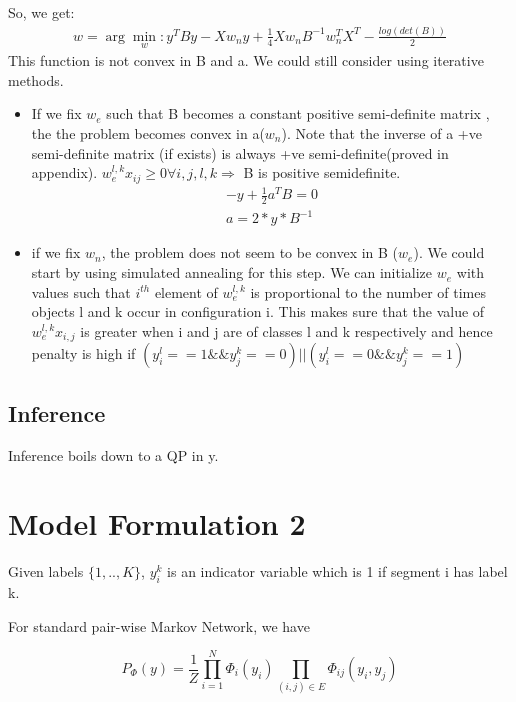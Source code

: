 \documentclass[11pt,a4paper,oneside]{report}
\begin{document}
So, we get:
\begin{eqnarray}
w=\arg\min_{w}:y^T B y-Xw_ny +\frac{1}{4}Xw_n B^{-1} w_n^TX^T-\frac{log(det(B))}{2}
\end{eqnarray}
This function is not convex in B and a. We could still consider using iterative methods.

\begin{itemize}
\item If we fix $w_e$ such that B becomes a constant positive semi-definite matrix , the the problem becomes convex in a($w_n$). Note that the inverse of a +ve semi-definite matrix (if exists) is always +ve semi-definite(proved in appendix). $w_e^{l,k}x_{ij} \ge 0 \forall i,j,l,k \Rightarrow$ B is positive semidefinite.
\begin{eqnarray}
-y +\frac{1}{2}a^TB=0\\
a=2*y*B^{-1}
\end{eqnarray}

\item if we fix $w_n$, the problem does not seem to be convex in B ($w_e$). We could start by using simulated annealing for this step. We can initialize $w_e$ with values such that $i^{th}$ element of $w_e^{l,k}$ is proportional to the number of times objects l and k occur in configuration i. This makes sure that the value of $w_e^{l,k}x_{i,j}$ is greater when i and j are of classes l and k respectively and hence penalty is high if  $(y_i^l==1 \&\& y_j^k==0) || (y_i^l==0 \&\& y_j^k==1)$
\end{itemize}

\subsection{Inference}
Inference boils down to a QP in y.

\section{Model Formulation 2}
Given labels $\{1,.., K\}$, $y_i^k$ is an indicator variable which is 1 if segment i has label k. 

For standard pair-wise Markov Network, we have 

\begin{equation}
  P_\Phi (y) = \frac{1}{Z} \prod_{i=1}^{N} \Phi_i(y_i) \prod_{(i,j)\in E} \Phi_{ij}(y_i,y_j)
  \end{equation}
  
\end{document}
